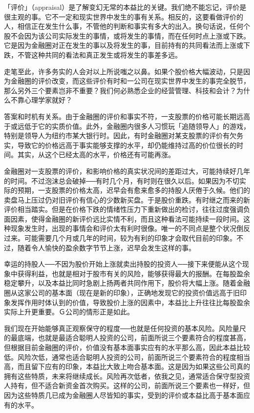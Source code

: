 \documentclass[UTF8,a4paper,zihao=-4,fontset = windows]{ctexart} %
\begin{document}
「评价」（appraisal）是了解变幻无常的本益比的关键。我们绝不能忘记，评价是很主观的事。它不一定和现实世界中发生的事有关系。相反的，这要看做评价的人，相信正在发生什么事，不管他的判断和事实有多大的出入。换句话说，任何个股不会因为该公司实际发生的事情，或将发生的事情，而在任何时点上涨或下跌。它是因为金融圈对正在发生的事以及将发生的事，目前持有的共同看法而上涨或下跌，不管这种共同的看法和真正发生或将发生的事差多远。

走笔至此，许多务实的人会对以上所说嗤之以鼻。如果个股价格大幅波动，只是因为金融圈的评价改变，而这些评价有时和一公司在现实世界中发生的事完全脱节，那么另外三个要素岂非不重要？我们何必熟悉企业的经营管理、科技和会计？为什么不靠心理学家就好？

答案和时机有关系。由于金融圈的评价和事实不符，一支股票的价格可能长期远高于或远低于它的实质价值。此外，金融圈内很多人习惯玩「追随领导人」的游戏，特别是领导人为纽约市某大银行时。因此，有时金融圈对某支股票的评价有欠务实，导致它的价格远高于事实能够支撑的水平，却仍能维持过高的价位很长的时间。其实，从这个已经太高的水平，价格还有可能再涨。

金融圈对一支股票的评价，和影响价格的真实状况间的差距过大，可能持续好几年的时间。不过泡沫总会破掉──有时几个月，有时则在很久以后。如果因为不切实际的预期，一支股票的价格太高，迟早会有愈来愈多的持股人厌倦于久候。他们的卖盘马上压过仍对旧评价有信心的少数新买盘。于是股价重跌。有时继之而来的新评价相当踏实。但是在价格下跌的情绪性压力下重新做出的检讨，往往过度强调负面因素，使得金融圈的新评价远比实情不利，而且这种看法可能持续一段时间。这种现象发生时，出现的事情会和评价太有利时很像。唯一的不同点是整个状况倒反过来。可能需要几个月或几年的时间，较为有利的印象才会取代目前的印象。不过，随着令人愉快的盈余数字节节上涨，迟早会发生这样的事。

幸运的持股人──不因为股价开始上涨就卖出持股的投资人──接下来便能从这个现象中获得利益，也就是相对于股市有关的风险，能够获得最大的报酬。在每股盈余稳定攀升，以及本益比同时急剧上扬两者共同作用下，股价将大幅上涨。随着金融圈从这家公司的基本面（现在是新的印象），正确地发现它的投资价值远高于旧印象发挥作用时体认到的价值，导致股价上涨的因素中，本益比上升往往比每股盈余实际上升更重要。Ｇ公司的情形正是如此。

我们现在开始能够真正观察保守的程度──也就是任何投资的基本风险。风险量尺的最底端，也就是最适合聪明人投资的公司，前面所说三个要素符合的程度甚高，但根据目前金融圈的评价，价值没有基本面事实应有的水平那么高，因此本益比较低。风险次低，通常也适合聪明人投资的公司，前面所说三个要素符合的程度相当高，而且留下应有的印象，本益比大致上吻合基本面。这是因为如果这些公司真的拥有这些特质，未来将继续成长。风险再次低者，依我之见，通常适合保守型投资人持有，但不适合新资金首次购买。这样的公司，前面所说三个要素也一样好，但因为这些特质几已成为金融圈人尽皆知的事实，受到的评价或本益比高于基本面应有的水平。
\end{document}
